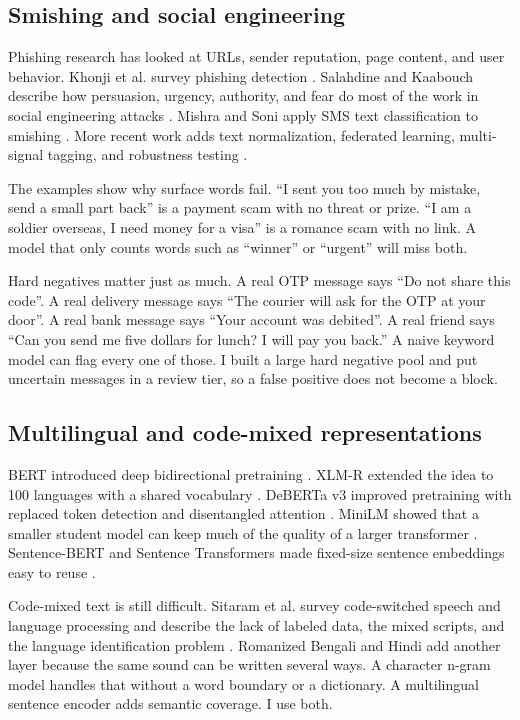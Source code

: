 \documentclass[11pt]{article}
\begin{document}
\subsection{Smishing and social engineering}

Phishing research has looked at URLs, sender reputation, page content, and user behavior. Khonji et al. survey phishing detection \cite{khonji2013}. Salahdine and Kaabouch describe how persuasion, urgency, authority, and fear do most of the work in social engineering attacks \cite{salahdine2019}. Mishra and Soni apply SMS text classification to smishing \cite{mishra2020}. More recent work adds text normalization, federated learning, multi-signal tagging, and robustness testing \cite{goel2024,remmide2025,hosseinpour2025,salman2026}.

The examples show why surface words fail. ``I sent you too much by mistake, send a small part back'' is a payment scam with no threat or prize. ``I am a soldier overseas, I need money for a visa'' is a romance scam with no link. A model that only counts words such as ``winner'' or ``urgent'' will miss both.

Hard negatives matter just as much. A real OTP message says ``Do not share this code''. A real delivery message says ``The courier will ask for the OTP at your door''. A real bank message says ``Your account was debited''. A real friend says ``Can you send me five dollars for lunch? I will pay you back.'' A naive keyword model can flag every one of those. I built a large hard negative pool and put uncertain messages in a review tier, so a false positive does not become a block.

\subsection{Multilingual and code-mixed representations}

BERT introduced deep bidirectional pretraining \cite{devlin2019}. XLM-R extended the idea to 100 languages with a shared vocabulary \cite{conneau2020}. DeBERTa v3 improved pretraining with replaced token detection and disentangled attention \cite{he2023}. MiniLM showed that a smaller student model can keep much of the quality of a larger transformer \cite{wang2020}. Sentence-BERT and Sentence Transformers made fixed-size sentence embeddings easy to reuse \cite{reimers2019,wolf2020}.

Code-mixed text is still difficult. Sitaram et al. survey code-switched speech and language processing and describe the lack of labeled data, the mixed scripts, and the language identification problem \cite{sitaram2019}. Romanized Bengali and Hindi add another layer because the same sound can be written several ways. A character n-gram model handles that without a word boundary or a dictionary. A multilingual sentence encoder adds semantic coverage. I use both.
\end{document}
